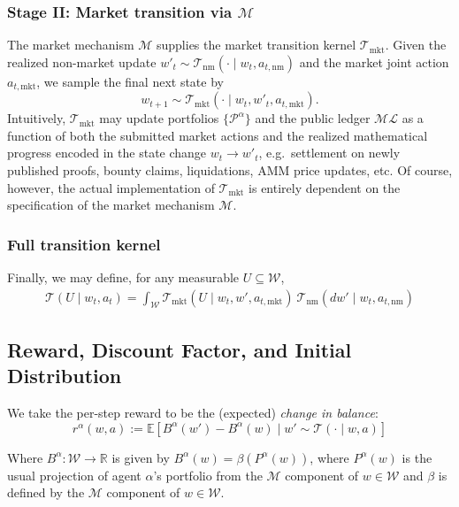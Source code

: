 \documentclass[letterpaper]{article} %
\begin{document}
\subsubsection{Stage II: Market transition via $\mathscr{M}$}

The market mechanism $\mathscr{M}$ supplies the market transition kernel $\mathcal{T}_{\mathrm{mkt}}$.
Given the realized non-market update $w'_t \sim \mathcal{T}_\mathrm{nm}(\cdot \mid w_t, a_{t,\mathrm{nm}})$ and the market joint action $a_{t,\mathrm{mkt}}$,
we sample the final next state by
\[
w_{t+1}\sim \mathcal{T}_{\mathrm{mkt}}(\cdot\mid w_t,w'_t,a_{t,\mathrm{mkt}}).
\]
Intuitively, $\mathcal{T}_{\mathrm{mkt}}$ may update portfolios $\{\mathcal{P}^\alpha\}$ and the public ledger $\mathcal{ML}$
as a function of both the submitted market actions and the realized mathematical progress encoded in the state change $w_t\to w'_t$,
e.g.\ settlement on newly published proofs, bounty claims, liquidations, AMM price updates, etc. Of course, however, the actual implementation of $\mathcal{T}_\mathrm{mkt}$ is entirely dependent on the specification of the market mechanism $\mathscr{M}$.

\subsubsection{Full transition kernel}


Finally, we may define, for any measurable $U\subseteq\mathcal{W}$,
\begin{align*}
\mathcal{T}(U\mid w_t,a_t) = \int_{\mathcal{W}}
\mathcal{T}_{\mathrm{mkt}}(U\mid w_t,w',a_{t,\mathrm{mkt}})
\ \mathcal{T}_{\mathrm{nm}}(dw'\mid w_t,a_{t,\mathrm{nm}})
\end{align*}



\subsection{Reward, Discount Factor, and Initial Distribution}

We take the per-step reward to be the (expected) \emph{change in balance}:
\[
r^\alpha(w,a) := \mathbb{E}[B^\alpha(w') - B^\alpha(w) \mid w' \sim \mathcal T(\cdot \mid w,a)]
\]

Where $B^\alpha : \mathcal{W} \to \mathbb{R}$ is given by $B^\alpha(w) = \beta(P^\alpha(w))$, where $P^\alpha(w)$ is the usual projection of agent $\alpha$'s portfolio from the $\mathcal{M}$ component of $w \in \mathcal{W}$ and $\beta$ is defined by the $\mathscr{M}$ component of $w \in \mathcal{W}$.
\end{document}
